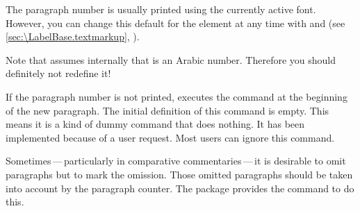 %
The paragraph number is usually printed using the currently active font.
However, you can change this default for the  element
at any time with %
 and
 (see
\autoref{sec:\LabelBase.textmarkup},
).%
%

Note that  assumes internally that
 is an Arabic number. Therefore you should definitely not
redefine it!%
\EndIndexGroup


\begin{Declaration}
\end{Declaration}
If the paragraph number is not printed,  executes the
 command at the beginning of the new paragraph. The
initial definition of this command is empty. This means it is a kind of dummy
command that does nothing. It has been implemented because of a user request.
Most users can ignore this command.%
\EndIndexGroup


\begin{Declaration}
\end{Declaration}
Sometimes\,---\,particularly in comparative
commentaries\,---\,it is desirable to omit paragraphs but to mark the
omission. Those omitted paragraphs should be taken
into account by the paragraph counter. The package  provides
the command  to do this.

